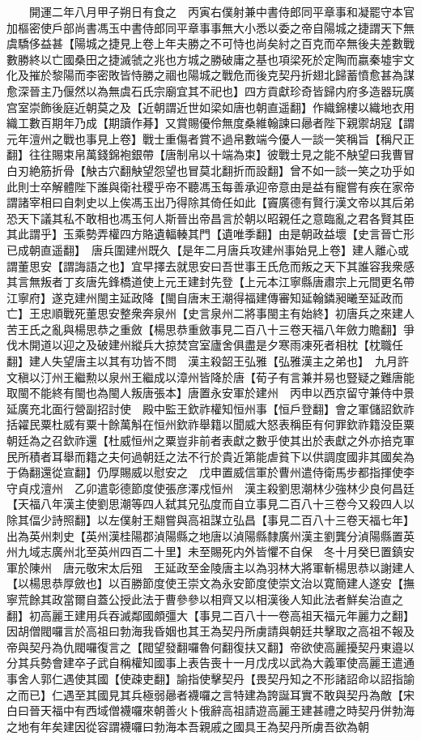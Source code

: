 　　開運二年八月甲子朔日有食之　丙寅右僕射兼中書侍郎同平章事和凝罷守本官加樞密使戶部尚書馮玉中書侍郎同平章事事無大小悉以委之帝自陽城之捷謂天下無虞驕侈益甚【陽城之捷見上卷上年夫勝之不可恃也尚矣紂之百克而卒無後夫差數戰數勝終以亡國桑田之捷滅虢之兆也方城之勝破庸之基也項梁死於定陶而嬴秦墟宇文化及摧於黎陽而李密敗皆恃勝之祻也陽城之戰危而後克契丹折翅北歸蓄憤愈甚為謀愈深晉主乃偃然以為無虞石氏宗廟宜其不祀也】四方貢獻珍奇皆歸内府多造器玩廣宫室崇飾後庭近朝莫之及【近朝謂近世如梁如唐也朝直遥翻】作織錦樓以織地衣用織工數百期年乃成【期讀作朞】又賞賜優伶無度桑維翰諫曰曏者陛下親禦胡寇【謂元年澶州之戰也事見上卷】戰士重傷者賞不過帛數端今優人一談一笑稱旨【稱尺正翻】往往賜束帛萬錢錦袍銀帶【唐制帛以十端為束】彼戰士見之能不觖望曰我曹冒白刃絶筋折骨【觖古穴翻觖望怨望也冒莫北翻折而設翻】曾不如一談一笑之功乎如此則士卒解體陛下誰與衛社稷乎帝不聽馮玉每善承迎帝意由是益有寵嘗有疾在家帝謂諸宰相曰自刺史以上俟馮玉出乃得除其倚任如此【竇廣德有賢行漢文帝以其后弟恐天下議其私不敢相也馮玉何人斯晉出帝昌言於朝以昭親任之意臨亂之君各賢其臣其此謂乎】玉乘勢弄權四方賂遺輻輳其門【遺唯季翻】由是朝政益壞【史言晉亡形已成朝直遥翻】　唐兵圍建州既久【是年二月唐兵攻建州事始見上卷】建人離心或謂董思安【謂誨語之也】宜早擇去就思安曰吾世事王氏危而叛之天下其誰容我衆感其言無叛者丁亥唐先鋒橋道使上元王建封先登【上元本江寧縣唐肅宗上元間更名帶江寧府】遂克建州閩主延政降【閩自唐末王潮得福建傳審知延翰鏻昶曦至延政而亡】王忠順戰死董思安整衆奔泉州【史言泉州二將事閩主有始終】初唐兵之來建人苦王氏之亂與楊思恭之重斂【楊思恭重斂事見二百八十三卷天福八年斂力贍翻】爭伐木開道以迎之及破建州縱兵大掠焚宫室廬舍俱盡是夕寒雨凍死者相枕【枕職任翻】建人失望唐主以其有功皆不問　漢主殺韶王弘雅【弘雅漢主之弟也】　九月許文稹以汀州王繼勲以泉州王繼成以漳州皆降於唐【荀子有言兼并易也豎疑之難唐能取閩不能終有閩也為閩人叛唐張本】唐置永安軍於建州　丙申以西京留守兼侍中景延廣充北面行營副招討使　殿中監王欽祚權知恒州事【恒戶登翻】會之軍儲詔欽祚括糴民粟杜威有粟十餘萬斛在恒州欽祚舉籍以聞威大怒表稱臣有何罪欽祚籍没臣粟朝廷為之召欽祚還【杜威恒州之粟豈非前者表獻之數乎使其出於表獻之外亦掊克軍民所積者耳舉而籍之夫何過朝廷之法不行於貴近第能虐貧下以供調度國非其國矣為于偽翻還從宣翻】仍厚賜威以慰安之　戊申置威信軍於曹州遣侍衛馬步都指揮使李守貞戍澶州　乙卯遣彰德節度使張彦澤戍恒州　漢主殺劉思潮林少強林少良何昌廷【天福八年漢主使劉思潮等四人弑其兄弘度而自立事見二百八十三卷今又殺四人以除其偪少詩照翻】以左僕射王翷嘗與高祖謀立弘昌【事見二百八十三卷天福七年】出為英州刺史【英州漢桂陽郡湞陽縣之地唐以湞陽縣隸廣州漢主劉龔分湞陽縣置英州九域志廣州北至英州四百二十里】未至賜死内外皆懼不自保　冬十月癸巳置鎮安軍於陳州　唐元敬宋太后殂　王延政至金陵唐主以為羽林大將軍斬楊思恭以謝建人【以楊思恭厚斂也】以百勝節度使王崇文為永安節度使崇文治以寛簡建人遂安【撫寧荒餘其政當爾自蓋公授此法于曹參參以相齊又以相漢後人知此法者鮮矣治直之翻】初高麗王建用兵吞滅鄰國頗彊大【事見二百八十一卷高祖天福元年麗力之翻】因胡僧閥囉言於高祖曰勃海我昏姻也其王為契丹所虜請與朝廷共擊取之高祖不報及帝與契丹為仇閥囉復言之【閥望發翻囉魯何翻復扶又翻】帝欲使高麗擾契丹東邉以分其兵勢會建卒子武自稱權知國事上表告喪十一月戊戌以武為大義軍使高麗王遣通事舍人郭仁遇使其國【使疎吏翻】諭指使擊契丹【畏契丹知之不形諸詔命以詔指諭之而已】仁遇至其國見其兵極弱曏者襪囉之言特建為誇誕耳實不敢與契丹為敵【宋白曰晉天福中有西域僧襪囉來朝善火卜俄辭高祖請遊高麗王建甚禮之時契丹併勃海之地有年矣建因從容謂襪囉曰勃海本吾親戚之國具王為契丹所虜吾欲為朝